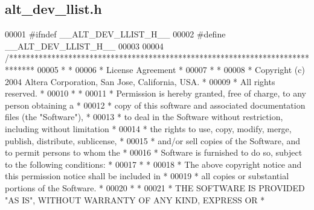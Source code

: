 \subsection{alt\+\_\+dev\+\_\+llist.\+h}
\label{alt__dev__llist_8h_source}

\begin{DoxyCode}
00001 \textcolor{preprocessor}{#ifndef \_\_ALT\_DEV\_LLIST\_H\_\_}
00002 \textcolor{preprocessor}{#define \_\_ALT\_DEV\_LLIST\_H\_\_}
00003 
00004 \textcolor{comment}{/******************************************************************************}
00005 \textcolor{comment}{*                                                                             *}
00006 \textcolor{comment}{* License Agreement                                                           *}
00007 \textcolor{comment}{*                                                                             *}
00008 \textcolor{comment}{* Copyright (c) 2004 Altera Corporation, San Jose, California, USA.           *}
00009 \textcolor{comment}{* All rights reserved.                                                        *}
00010 \textcolor{comment}{*                                                                             *}
00011 \textcolor{comment}{* Permission is hereby granted, free of charge, to any person obtaining a     *}
00012 \textcolor{comment}{* copy of this software and associated documentation files (the "Software"),  *}
00013 \textcolor{comment}{* to deal in the Software without restriction, including without limitation   *}
00014 \textcolor{comment}{* the rights to use, copy, modify, merge, publish, distribute, sublicense,    *}
00015 \textcolor{comment}{* and/or sell copies of the Software, and to permit persons to whom the       *}
00016 \textcolor{comment}{* Software is furnished to do so, subject to the following conditions:        *}
00017 \textcolor{comment}{*                                                                             *}
00018 \textcolor{comment}{* The above copyright notice and this permission notice shall be included in  *}
00019 \textcolor{comment}{* all copies or substantial portions of the Software.                         *}
00020 \textcolor{comment}{*                                                                             *}
00021 \textcolor{comment}{* THE SOFTWARE IS PROVIDED "AS IS", WITHOUT WARRANTY OF ANY KIND, EXPRESS OR  *}

\end{DoxyCode}
